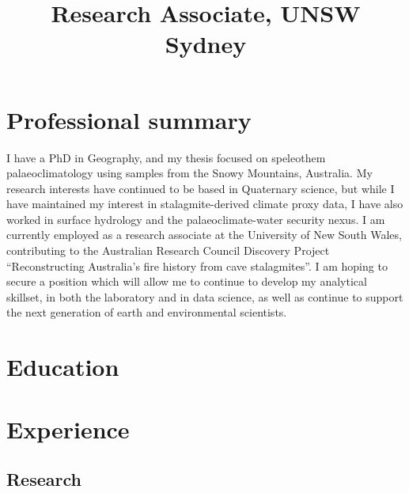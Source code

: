 \documentclass[11pt,a4paper,]{moderncv}
\title{Research Associate, UNSW Sydney}
\begin{document}
\makecvtitle



\hypertarget{professional-summary}{%
\section{Professional summary}\label{professional-summary}}

I have a PhD in Geography, and my thesis focused on speleothem
palaeoclimatology using samples from the Snowy Mountains, Australia. My
research interests have continued to be based in Quaternary science, but
while I have maintained my interest in stalagmite-derived climate proxy
data, I have also worked in surface hydrology and the
palaeoclimate-water security nexus. I am currently employed as a
research associate at the University of New South Wales, contributing to
the Australian Research Council Discovery Project ``Reconstructing
Australia's fire history from cave stalagmites''. I am hoping to secure
a position which will allow me to continue to develop my analytical
skillset, in both the laboratory and in data science, as well as
continue to support the next generation of earth and environmental
scientists.

\hypertarget{education}{%
\section{Education}\label{education}}

\nopagebreak
    \nopagebreak

\hypertarget{experience}{%
\section{Experience}\label{experience}}

\hypertarget{research}{%
\subsection{Research}\label{research}}
\end{document}
